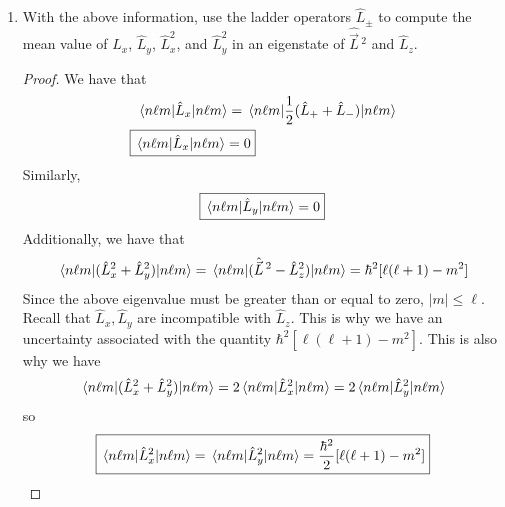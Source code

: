 \documentclass[../psets.tex]{subfiles}
\begin{document}
\begin{enumerate}
\begin{enumerate}
        \begin{proof}
            We have that
            \begin{align*}
                \hat{L}_-\hat{L}_+ &= (\hat{L}_x-i\hat{L}_y)(\hat{L}_x+i\hat{L}_y)\\
                &= \hat{L}_x^2+\hat{L}_y^2+\hat{L}_z^2-i[\hat{L}_y,\hat{L}_x]-\hat{L}_z^2\\
                &= \hat{\vec{L}}{\,}^2-\hat{L}_z^2-\hbar\hat{L}_z\\
                \hat{\vec{L}}{\,}^2 &= \hat{L}_-\hat{L}_++\hbar\hat{L}_z+\hat{L}_z^2
            \end{align*}
        \end{proof}
        \item With the above information, use the ladder operators $\hat{L}_\pm$ to compute the mean value of $\hat{L}_x$, $\hat{L}_y$, $\hat{L}_x^2$, and $\hat{L}_y^2$ in an eigenstate of $\hat{\vec{L}}{\,}^2$ and $\hat{L}_z$.
        \begin{proof}
            We have that
            \begin{align*}
                \ev{\hat{L}_x}{n\ell m} &= \ev{\frac{1}{2}(\hat{L}_++\hat{L}_-)}{n\ell m}\\
                \Aboxed{\ev{\hat{L}_x}{n\ell m} &= 0}
            \end{align*}
            Similarly,
            \begin{equation*}
                \boxed{\ev{\hat{L}_y}{n\ell m} = 0}
            \end{equation*}
            Additionally, we have that
            \begin{equation*}
                \ev{(\hat{L}_x^2+\hat{L}_y^2)}{n\ell m} = \ev{(\hat{\vec{L}}{\,}^2-\hat{L}_z^2)}{n\ell m} = \hbar^2[\ell(\ell+1)-m^2]
            \end{equation*}
            Since the above eigenvalue must be greater than or equal to zero, $|m|\leq\ell$.
            Recall that $\hat{L}_x,\hat{L}_y$ are incompatible with $\hat{L}_z$.
            This is why we have an uncertainty associated with the quantity $\hbar^2[\ell(\ell+1)-m^2]$.
            This is also why we have
            \begin{equation*}
                \ev{(\hat{L}_x^2+\hat{L}_y^2)}{n\ell m} = 2\ev{\hat{L}_x^2}{n\ell m}
                = 2\ev{\hat{L}_y^2}{n\ell m}
            \end{equation*}
            so
            \begin{equation*}
                \boxed{\ev{\hat{L}_x^2}{n\ell m} = \ev{\hat{L}_y^2}{n\ell m}
                = \frac{\hbar^2}{2}[\ell(\ell+1)-m^2]}
            \end{equation*}
        \end{proof}
    \end{enumerate}
\end{enumerate}
\end{document}
